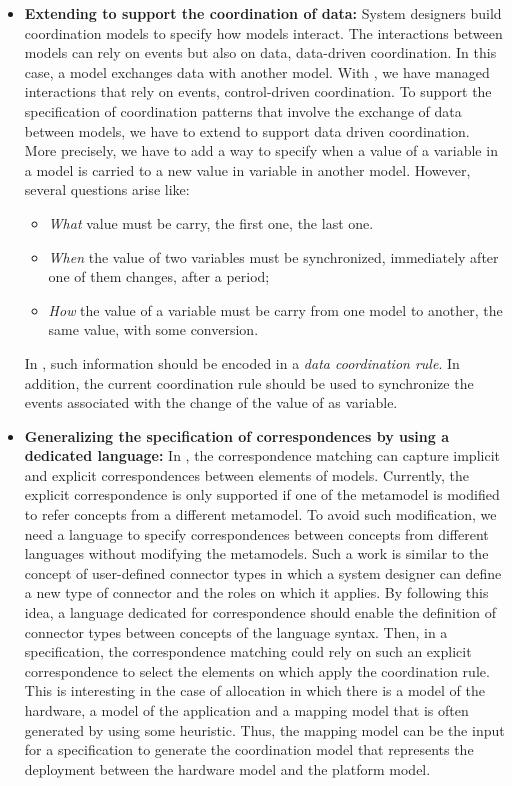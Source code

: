 \begin{itemize}
	\item \textbf{Extending \bcool to support the coordination of data:} System designers build coordination models to specify how models interact. The interactions between models can rely on events but also on data, \ie data-driven coordination. In this case, a model exchanges data with another model. With \bcool, we have managed interactions that rely on events, \ie control-driven coordination. To support the specification of coordination patterns that involve the exchange of data between models, we have to extend \bcool to support data driven coordination. More precisely, we have to add a way to specify when a value of a variable in a model is carried to a new value in variable in another model. However, several questions arise like:
			\begin{itemize}
				\item \emph{What} value must be carry, \eg the first one, the last one.
				\item \emph{When} the value of two variables must be synchronized, \eg immediately after one of them changes, after a period;
				\item \emph{How} the value of a variable must be carry from one model to another, \eg the same value, with some conversion. 
			\end{itemize}
	In \bcool, such information should be encoded in a \emph{data coordination rule}. In addition, the current coordination rule should be used to synchronize the events associated with the change of the value of as variable. 	 
	\item \textbf{Generalizing the specification of correspondences by using a dedicated language:} In \bcool, the correspondence matching can capture implicit and explicit correspondences between elements of models. Currently, the explicit correspondence is only supported if one of the metamodel is modified to refer concepts from a different metamodel. To avoid such modification, we need a language to specify correspondences between concepts from different languages without modifying the metamodels. Such a work is similar to the concept of user-defined connector types in which a system designer can define a new type of connector and the roles on which it applies. By following this idea, a language dedicated for correspondence should enable the definition of connector types between concepts of the language syntax. Then, in a \bcool specification, the correspondence matching could rely on such an explicit correspondence to select the elements on which apply the coordination rule. This is interesting in the case of allocation in which there is a model of the hardware, a model of the application and a mapping model that is often generated by using some heuristic. Thus, the mapping model can be the input for a \bcool specification to generate the coordination model that represents the deployment between the hardware model and the platform model.  

\end{itemize}
